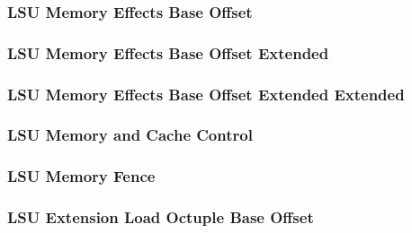 \subsubsection[{\small LSU Memory Effects Base Offset}]{LSU Memory Effects Base Offset} \label{sec:format-LSU-FXBO}



\subsubsection[{\small LSU Memory Effects Base Offset Extended}]{LSU Memory Effects Base Offset Extended} \label{sec:format-LSU-FXBO.X}



\subsubsection[{\small LSU Memory Effects Base Offset Extended Extended}]{LSU Memory Effects Base Offset Extended Extended} \label{sec:format-LSU-FXBO.Y}



\subsubsection[{\small LSU Memory and Cache Control}]{LSU Memory and Cache Control} \label{sec:format-LSU-MCC}



\subsubsection[{\small LSU Memory Fence}]{LSU Memory Fence} \label{sec:format-LSU-FENCE}



\subsubsection[{\small LSU Extension Load Octuple Base Offset}]{LSU Extension Load Octuple Base Offset} \label{sec:format-LSU-XLOBO}

